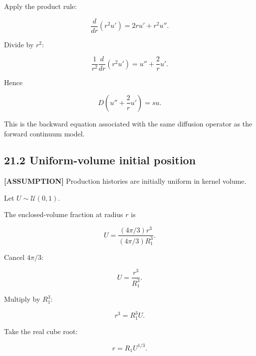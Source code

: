 \documentclass[11pt,a4paper]{article}
\begin{document}
Apply the product rule:

\begin{equation}
\frac{d}{dr}(r^2u')=2ru'+r^2u''.
\tag{TRISO-FPT-008}
\label{eq:triso-fpt-008}
\end{equation}

Divide by $r^2$:

\begin{equation}
\frac{1}{r^2}\frac{d}{dr}(r^2u')
=
u''+\frac{2}{r}u'.
\tag{TRISO-FPT-009}
\label{eq:triso-fpt-009}
\end{equation}

Hence

\begin{equation}
\boxed{
D\left(u''+\frac{2}{r}u'\right)=su.
}
\tag{TRISO-FPT-010}
\label{eq:triso-fpt-010}
\end{equation}

This is the backward equation associated with the same diffusion operator as the forward continuum model.

\subsection*{21.2 Uniform-volume initial position}

\textbf{[ASSUMPTION]} Production histories are initially uniform in kernel volume.

Let $U\sim\mathcal U(0,1)$.

The enclosed-volume fraction at radius $r$ is

\begin{equation}
U
=
\frac{(4\pi/3)r^3}{(4\pi/3)R_1^3}.
\tag{TRISO-WOS-001}
\label{eq:triso-wos-001}
\end{equation}

Cancel $4\pi/3$:

\begin{equation}
U=\frac{r^3}{R_1^3}.
\tag{TRISO-WOS-002}
\label{eq:triso-wos-002}
\end{equation}

Multiply by $R_1^3$:

\begin{equation}
r^3=R_1^3U.
\tag{TRISO-WOS-003}
\label{eq:triso-wos-003}
\end{equation}

Take the real cube root:

\begin{equation}
\boxed{r=R_1U^{1/3}.}
\tag{TRISO-WOS-004}
\label{eq:triso-wos-004}
\end{equation}
\end{document}
